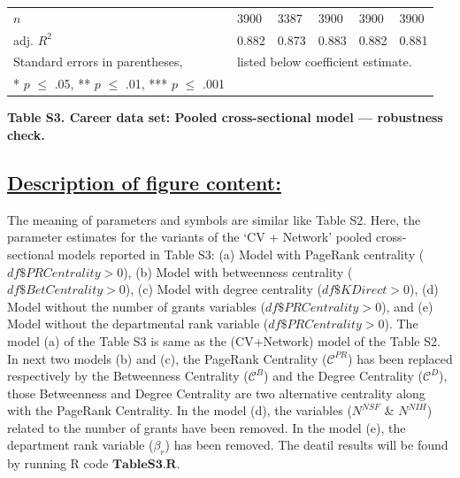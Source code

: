 \documentclass{article}\usepackage[]{graphicx}\usepackage[]{color}
\begin{document}
\begin{table}[h!]
\begin{center}
{\begin{tabular}{l l l l l l}
    \hline
    
    \rowcolor{gray!33} 
    $\textit{n}$
    & 3900 & 3387 & 3900 & 3900 & 3900 \\
    
    \rowcolor{gray!33} 
    adj. ${R^2}$ 
    & 0.882 & 0.873 & 0.883 & 0.882 & 0.881 \\
    
    \hline
    \hline
    
    Standard errors in parentheses, & \multicolumn{5}{l}{listed below coefficient estimate.} \\
    {* $\textit{p}$ $\leq$ .05, ** $\textit{p}$ $\leq$ .01, *** $\textit{p}$ $\leq$ .001}
    
  \end{tabular}%
  }
  \end{center}
\end{table}
\begin{center}
\par{\textbf{Table S3. Career data set: Pooled cross-sectional model --- robustness check.}}
\end{center}
\newpage
\subsection*{\underline{Description of figure content:}}
\par{
The meaning of parameters and symbols are similar like Table S2. Here, the parameter estimates for the variants of the ‘CV + Network’ pooled cross-sectional models reported in Table S3: (a) Model with PageRank centrality ($df\$PRCentrality > 0$), (b) Model with betweenness centrality ($df\$BetCentrality > 0$), (c) Model with degree centrality ($df\$KDirect > 0$), (d) Model without the number of grants variables ($df\$PRCentrality > 0$), and (e) Model without the departmental rank variable ($df\$PRCentrality > 0$). The model (a) of the Table S3 is same as the (CV+Network) model of the Table S2. In next two models (b) and (c), the PageRank Centrality ($\mathscr{C}^{PR}$) has been replaced respectively by the Betweenness Centrality ($\mathscr{C}^{B}$) and the Degree Centrality ($\mathscr{C}^{D}$), those Betweenness and Degree Centrality are two alternative centrality along with the PageRank Centrality. In the model (d), the variables (${N^{NSF}}$ \& ${N^{NIH}}$) related to the number of grants have been removed. In the model (e), the department rank variable ($\beta_{r}$) has been removed. The deatil results will be found by running R code $\textbf{TableS3.R}$.
}
\end{document}

